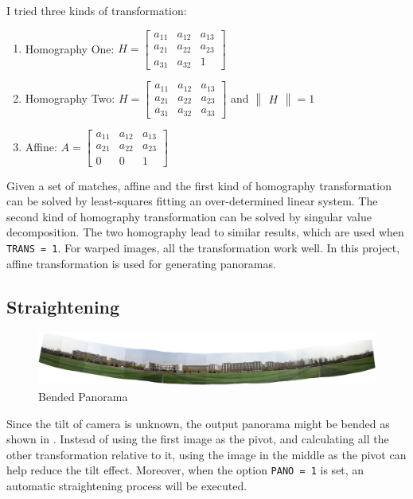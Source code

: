 I tried three kinds of transformation:
\begin{enumerate}
  \item Homography One: $H = \begin{bmatrix} a_{11} &a_{12} & a_{13}\\ a_{21} & a_{22} & a_{23}\\ a_{31} & a_{32} & 1\end{bmatrix}$

  \item Homography Two:
    $H = \begin{bmatrix} a_{11} &a_{12} & a_{13}\\ a_{21} & a_{22} & a_{23}\\ a_{31} & a_{32} & a_{33}\end{bmatrix} $
    and $\begin{Vmatrix} H \end{Vmatrix} = 1$

  \item Affine:
    $A = \begin{bmatrix} a_{11} &a_{12} & a_{13}\\ a_{21} & a_{22} & a_{23}\\ 0 & 0 & 1\end{bmatrix}$
\end{enumerate}

Given a set of matches, affine and the first kind of homography transformation can be solved
by least-squares fitting an over-determined linear system.
The second kind of homography transformation can be solved by singular value decomposition.
The two homography lead to similar results, which are used when \verb|TRANS = 1|.
For warped images, all the transformation work well.
In this project, affine transformation is used for generating panoramas.

\subsection{Straightening}
\begin{figure}[H]
  \centering
  \includegraphics[width=\textwidth]{res/bend.png}
  \caption{Bended Panorama\label{fig:bend}}
\end{figure}

Since the tilt of camera is unknown, the output panorama might be bended as shown in .
Instead of using the first image as the pivot, and calculating all the other transformation relative to it,
using the image in the middle as the pivot can help reduce the tilt effect.
Moreover, when the option \verb|PANO = 1| is set, an automatic straightening process will be executed.

